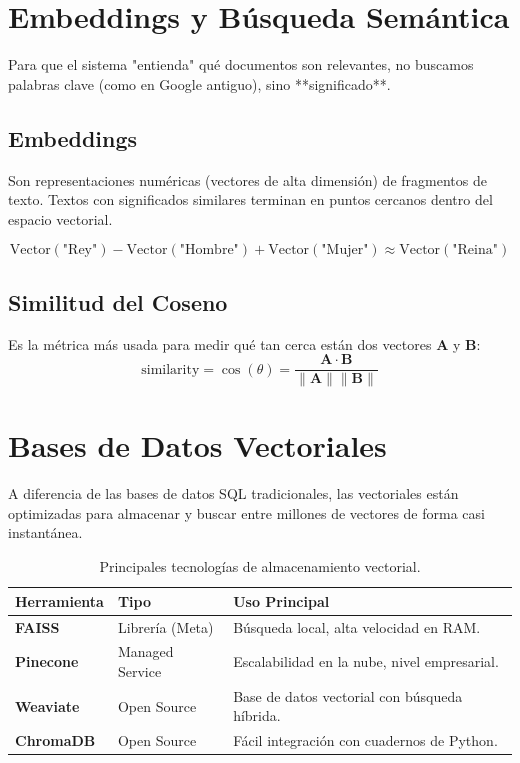 \documentclass[12pt,a4paper,openany,oneside]{book}
\begin{document}
\section{Embeddings y Búsqueda Semántica}

Para que el sistema "entienda" qué documentos son relevantes, no buscamos palabras clave (como en Google antiguo), sino **significado**. 

\subsection{Embeddings}
Son representaciones numéricas (vectores de alta dimensión) de fragmentos de texto. Textos con significados similares terminan en puntos cercanos dentro del espacio vectorial.

\[ \text{Vector}(\text{"Rey"}) - \text{Vector}(\text{"Hombre"}) + \text{Vector}(\text{"Mujer"}) \approx \text{Vector}(\text{"Reina"}) \]

\subsection{Similitud del Coseno}
Es la métrica más usada para medir qué tan cerca están dos vectores $\mathbf{A}$ y $\mathbf{B}$:
\[ \text{similarity} = \cos(\theta) = \frac{\mathbf{A} \cdot \mathbf{B}}{\|\mathbf{A}\| \|\mathbf{B}\|} \]

\section{Bases de Datos Vectoriales}

A diferencia de las bases de datos SQL tradicionales, las vectoriales están optimizadas para almacenar y buscar entre millones de vectores de forma casi instantánea.

\begin{table}[h]
\centering
\begin{tabular}{@{}lll@{}}
\toprule
\textbf{Herramienta} & \textbf{Tipo} & \textbf{Uso Principal} \\ \midrule
\textbf{FAISS} & Librería (Meta) & Búsqueda local, alta velocidad en RAM. \\
\textbf{Pinecone} & Managed Service & Escalabilidad en la nube, nivel empresarial. \\
\textbf{Weaviate} & Open Source & Base de datos vectorial con búsqueda híbrida. \\
\textbf{ChromaDB} & Open Source & Fácil integración con cuadernos de Python. \\ \bottomrule
\end{tabular}
\caption{Principales tecnologías de almacenamiento vectorial.}
\end{table}
\end{document}
